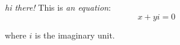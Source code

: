 \textit{hi there!} This is {\em an equation}:
\begin{equation}
    x + y i = 0
\end{equation}

where $i$ is the imaginary unit.
